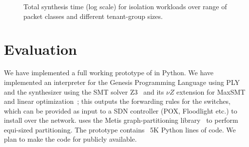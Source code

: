 \begin{figure*}
	\centering
	\caption{\label{fig:isolation}
		Total synthesis time (log scale) for isolation workloads over range of packet classes and different tenant-group sizes.}
\end{figure*}

\section{Evaluation} \label{sec:evaluation}

 We have implemented a full working
prototype of \Name in Python. We have implemented an interpreter for
the Genesis Programming Language using PLY~\cite{ply} and the synthesizer using 
the SMT solver Z3~\cite{z3} and its $\nu Z$ extension for MaxSMT and linear
 optimization~\cite{nuz3}; this outputs the
forwarding rules for the switches, which can be provided as input to a
SDN controller (POX, Floodlight etc.) to install over the
network. \Name uses the Metis graph-partitioning library~\cite{metis}
to perform equi-sized partitioning.  The prototype contains ~5K Python lines of code.  
We plan to make the code for \Name publicly available.

